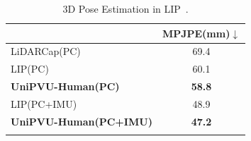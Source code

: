
\begin{table}\scriptsize
\centering
\caption{3D Pose Estimation in LIP~\cite{ren2023lidar}.}
\label{experiment:pose estimation}
\begin{tabular}{l|c}
\Xhline{1px}
           & \multicolumn{1}{l}{MPJPE(mm)$\downarrow$} \\ \hline 
LiDARCap(PC)~\cite{li2022lidarcap}          & 69.4                           \\ \hline \hline
LIP(PC)~\cite{ren2023lidar} & 60.1                           \\ \hline
\textbf{UniPVU-Human(PC)}& \textbf{58.8}                          \\ \hline \hline
LIP(PC+IMU)~\cite{ren2023lidar} & 48.9                           \\ \hline
\textbf{UniPVU-Human(PC+IMU)}& \textbf{47.2}                          \\ 

\Xhline{1px}
\end{tabular}
\end{table}


